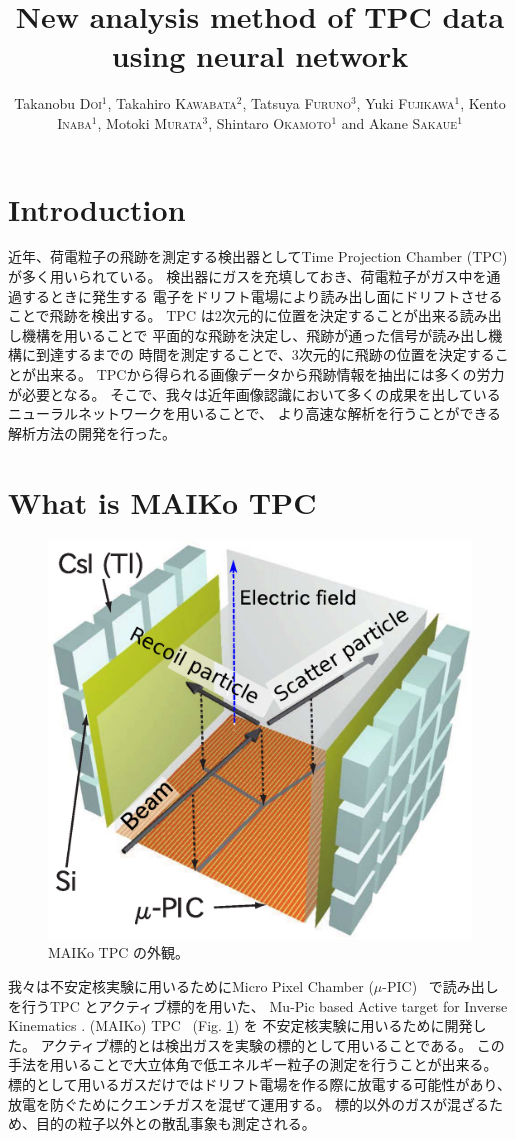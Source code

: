 \documentclass{jps-cp}
\title{New analysis method of TPC data using neural network}
\author{
  Takanobu \textsc{Doi}$^{1}$, Takahiro \textsc{Kawabata}$^{2}$, Tatsuya \textsc{Furuno}$^{3}$,
  Yuki \textsc{Fujikawa}$^{1}$, Kento \textsc{Inaba}$^{1}$, Motoki \textsc{Murata}$^{3}$,
  Shintaro \textsc{Okamoto}$^{1}$ and Akane \textsc{Sakaue}$^{1}$}
\begin{document}
\maketitle

\section{Introduction}
近年、荷電粒子の飛跡を測定する検出器としてTime Projection Chamber (TPC) が多く用いられている。
検出器にガスを充填しておき、荷電粒子がガス中を通過するときに発生する
電子をドリフト電場により読み出し面にドリフトさせることで飛跡を検出する。
TPC は2次元的に位置を決定することが出来る読み出し機構を用いることで
平面的な飛跡を決定し、飛跡が通った信号が読み出し機構に到達するまでの
時間を測定することで、3次元的に飛跡の位置を決定することが出来る。
TPCから得られる画像データから飛跡情報を抽出には多くの労力が必要となる。
そこで、我々は近年画像認識において多くの成果を出しているニューラルネットワークを用いることで、
より高速な解析を行うことができる解析方法の開発を行った。

\section{What is MAIKo TPC}

\begin{figure}
  \begin{center}
    \includegraphics[clip, width=0.4\columnwidth]{eps/at_fig2.eps}
    \caption{MAIKo TPC の外観。}
    \label{fig:MAIKo}
  \end{center}
\end{figure}

我々は不安定核実験に用いるためにMicro Pixel Chamber ($\mu$-PIC)~\cite{mupic} 
で読み出しを行うTPC とアクティブ標的を用いた、
Mu-Pic based Active target for Inverse Kinematics . (MAIKo) TPC~\cite{MAIKo} (Fig. \ref{fig:MAIKo}) を
不安定核実験に用いるために開発した。
アクティブ標的とは検出ガスを実験の標的として用いることである。
この手法を用いることで大立体角で低エネルギー粒子の測定を行うことが出来る。
標的として用いるガスだけではドリフト電場を作る際に放電する可能性があり、
放電を防ぐためにクエンチガスを混ぜて運用する。
標的以外のガスが混ざるため、目的の粒子以外との散乱事象も測定される。
\end{document}
